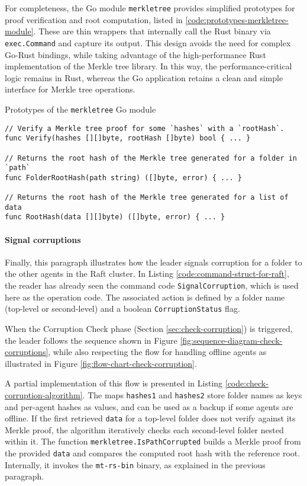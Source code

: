 For completeness, the Go module \texttt{merkletree} provides simplified prototypes for 
proof verification and root computation, listed in \ref{code:prototypes-merkletree-module}. 
These are thin wrappers that internally call the Rust binary via 
\texttt{exec.Command} and capture its output. This design avoids the need for 
complex Go-Rust bindings, while taking advantage of the high-performance Rust 
implementation of the Merkle tree library. In this way, the performance-critical 
logic remains in Rust, whereas the Go application retains a clean and simple 
interface for Merkle tree operations.  

\begin{listing}[htp]
\caption{Prototypes of the \texttt{merkletree} Go module}
\label{code:prototypes-merkletree-module}
\begin{verbatim}
// Verify a Merkle tree proof for some `hashes` with a `rootHash`.
func Verify(hashes [][]byte, rootHash []byte) bool { ... }

// Returns the root hash of the Merkle tree generated for a folder in `path`
func FolderRootHash(path string) ([]byte, error) { ... }

// Returns the root hash of the Merkle tree generated for a list of data
func RootHash(data [][]byte) ([]byte, error) { ... }
\end{verbatim}
\end{listing}

\paragraph{Signal corruptions}

Finally, this paragraph illustrates how the leader signals corruption for a folder
to the other agents in the Raft cluster. In Listing
\ref{code:command-struct-for-raft}, the reader has already seen the command code
\texttt{SignalCorruption}, which is used here as the operation code. The
associated action is defined by a folder name (top-level or second-level) and a
boolean \texttt{CorruptionStatus} flag.

When the Corruption Check phase (Section \ref{sec:check-corruption}) is triggered,
the leader follows the sequence shown in Figure
\ref{fig:sequence-diagram-check-corruptions}, while also respecting the flow for
handling offline agents as illustrated in Figure
\ref{fig:flow-chart-check-corruption}.

A partial implementation of this flow is presented in Listing
\ref{code:check-corruption-algorithm}. The maps \texttt{hashes1} and
\texttt{hashes2} store folder names as keys and per-agent hashes as values, and
can be used as a backup if some agents are offline. If the first retrieved
\texttt{data} for a top-level folder does not verify against its Merkle proof,
the algorithm iteratively checks each second-level folder nested within it. The
function \texttt{merkletree.IsPathCorrupted} builds a Merkle proof from the
provided \texttt{data} and compares the computed root hash with the reference
root. Internally, it invokes the \texttt{mt-rs-bin} binary, as explained in the
previous paragraph.

